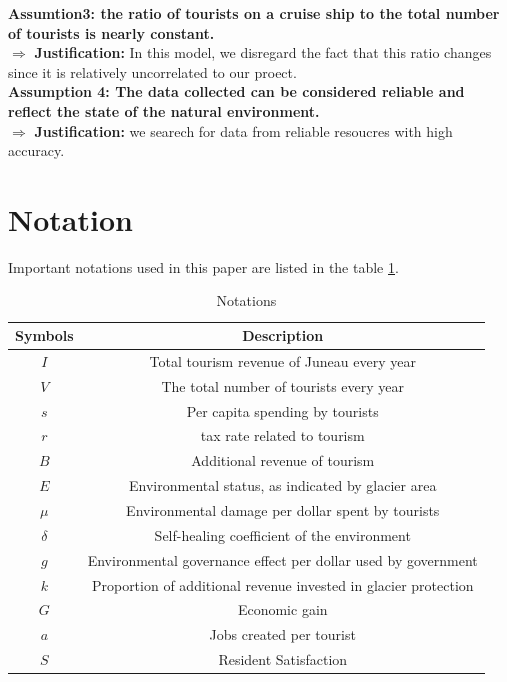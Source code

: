 \documentclass[UTF8]{mcmthesis}
\begin{document}
               \textbf{Assumtion3: the ratio  of tourists on a cruise ship to the total number of tourists is nearly constant.} \\
                \hspace*{2em} \(\Rightarrow\) \textbf{Justification:} In this model, we disregard the fact that this ratio changes since it is relatively uncorrelated to our proect.\\
                
                \textbf{Assumption 4: The data collected can be considered reliable and reflect the state of the natural environment.} 
        \\        \hspace*{2em} \(\Rightarrow\) \textbf{Justification:} we searech for data from reliable resoucres with high accuracy.
    \section{Notation}
        \hspace*{2em}Important notations used in this paper are listed in the table \ref{tab:notations}.
        \vspace{-.5em}
        \begin{table}[htbp]
            \centering
            \caption{Notations}
            \vspace{0.5em}
            \begin{tabular}{cc}
                \toprule                %
                    \textbf{Symbols} & \textbf{Description} \\ 
                \midrule                %
                $I$        & Total tourism revenue of Juneau every year \\ 
                $V$        & The total number of tourists every year \\ 
                $s$        & Per capita spending by tourists \\ 
                $r$        & tax rate related to tourism \\  
                $B$        & Additional revenue of tourism \\ 
                $E$        & Environmental status, as indicated by glacier area \\ 
                $\mu$      & Environmental damage per dollar spent by tourists \\ 
                $\delta$   & Self-healing coefficient of the environment  \\ 
                $g$        & Environmental governance effect per dollar used by government \\ 
                $k$        & Proportion of additional revenue invested in glacier protection \\ 
                $G$        & Economic gain \\ 
                $a$        & Jobs created per tourist \\ 
                $S$        & Resident Satisfaction \\  
                \bottomrule             %
            \end{tabular}
            \label{tab:notations}
        \end{table}
\end{document}
